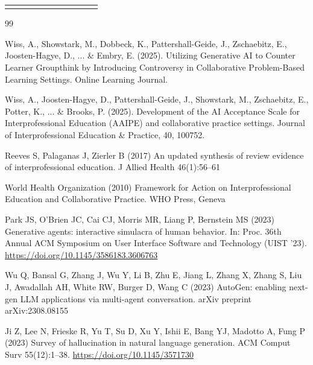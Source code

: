 \documentclass[pdflatex,sn-mathphys-num]{sn-jnl}
\theoremstyle{thmstyleone}
\theoremstyle{thmstyletwo}
\theoremstyle{thmstylethree}
\begin{document}
\begin{appendices}
\begin{table}
\begin{tabular}{@{}lrrrrrrrrrr@{}}
\botrule
\end{tabular}
\end{table}

\end{appendices}

\clearpage
\begin{thebibliography}{99}

Wiss, A., Showstark, M., Dobbeck, K., Pattershall-Geide, J., Zschaebitz, E., Joosten-Hagye, D., ... \& Embry, E. (2025). Utilizing Generative AI to Counter Learner Groupthink by Introducing Controversy in Collaborative Problem-Based Learning Settings. Online Learning Journal.

Wiss, A., Joosten-Hagye, D., Pattershall-Geide, J., Showstark, M., Zschaebitz, E., Potter, K., ... \& Brooks, P. (2025). Development of the AI Acceptance Scale for Interprofessional Education (AAIPE) and collaborative practice settings. Journal of Interprofessional Education \& Practice, 40, 100752. 

Reeves S, Palaganas J, Zierler B (2017) An updated synthesis of review evidence of interprofessional education. J Allied Health 46(1):56--61

World Health Organization (2010) Framework for Action on Interprofessional Education and Collaborative Practice. WHO Press, Geneva

Park JS, O'Brien JC, Cai CJ, Morris MR, Liang P, Bernstein MS (2023) Generative agents: interactive simulacra of human behavior. In: Proc. 36th Annual ACM Symposium on User Interface Software and Technology (UIST '23). \url{https://doi.org/10.1145/3586183.3606763}

Wu Q, Bansal G, Zhang J, Wu Y, Li B, Zhu E, Jiang L, Zhang X, Zhang S, Liu J, Awadallah AH, White RW, Burger D, Wang C (2023) AutoGen: enabling next-gen LLM applications via multi-agent conversation. arXiv preprint arXiv:2308.08155

Ji Z, Lee N, Frieske R, Yu T, Su D, Xu Y, Ishii E, Bang YJ, Madotto A, Fung P (2023) Survey of hallucination in natural language generation. ACM Comput Surv 55(12):1--38. \url{https://doi.org/10.1145/3571730}


\end{thebibliography}
\end{document}

